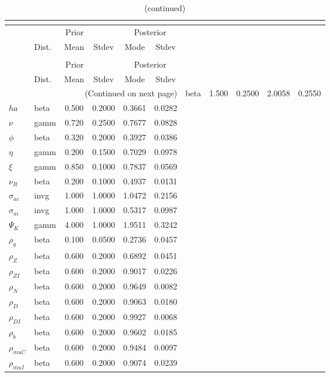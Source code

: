 
\begin{center}
\begin{longtable}{llcccc} 
\caption{Results from posterior maximization (parameters)}\\
 \label{Table:Posterior:1}\\
\toprule 
  & \multicolumn{3}{c}{Prior}  &  \multicolumn{2}{c}{Posterior} \\
  \cmidrule(r{.75em}){2-4} \cmidrule(r{.75em}){5-6}
  & Dist. & Mean  & Stdev & Mode & Stdev \\ 
\midrule \endfirsthead 
\caption{(continued)}\\
 \bottomrule 
  & \multicolumn{3}{c}{Prior}  &  \multicolumn{2}{c}{Posterior} \\
  \cmidrule(r{.75em}){2-4} \cmidrule(r{.75em}){5-6}
  & Dist. & Mean  & Stdev & Mode & Stdev \\ 
\midrule \endhead 
\bottomrule \multicolumn{6}{r}{(Continued on next page)}\endfoot 
\bottomrule\endlastfoot 
${\sigma}$ & beta &   1.500 & 0.2500 &   2.0058 &  0.2550 \\ 
${ha}$ & beta &   0.500 & 0.2000 &   0.3661 &  0.0282 \\ 
$\nu$ & gamm &   0.720 & 0.2500 &   0.7677 &  0.0828 \\ 
${\phi}$ & beta &   0.320 & 0.2000 &   0.3927 &  0.0386 \\ 
${\eta}$ & gamm &   0.200 & 0.1500 &   0.7029 &  0.0978 \\ 
$\xi$ & gamm &   0.850 & 0.1000 &   0.7837 &  0.0569 \\ 
${\nu_R}$ & beta &   0.200 & 0.1000 &   0.4937 &  0.0131 \\ 
${\sigma_{ac}}$ & invg &   1.000 & 1.0000 &   1.0472 &  0.2156 \\ 
${\sigma_{ai}}$ & invg &   1.000 & 1.0000 &   0.5317 &  0.0987 \\ 
${\Psi_{K}}$ & gamm &   4.000 & 1.0000 &   1.9511 &  0.3242 \\ 
${\rho_g}$ & beta &   0.100 & 0.0500 &   0.2736 &  0.0457 \\ 
${\rho_Z}$ & beta &   0.600 & 0.2000 &   0.6892 &  0.0451 \\ 
${\rho_{ZI}}$ & beta &   0.600 & 0.2000 &   0.9017 &  0.0226 \\ 
${\rho_N}$ & beta &   0.600 & 0.2000 &   0.9649 &  0.0082 \\ 
${\rho_D}$ & beta &   0.600 & 0.2000 &   0.9063 &  0.0180 \\ 
${\rho_{DI}}$ & beta &   0.600 & 0.2000 &   0.9927 &  0.0068 \\ 
${\rho_b}$ & beta &   0.600 & 0.2000 &   0.9602 &  0.0185 \\ 
${\rho_{muC}}$ & beta &   0.600 & 0.2000 &   0.9484 &  0.0097 \\ 
${\rho_{muI}}$ & beta &   0.600 & 0.2000 &   0.9074 &  0.0239 \\ 
\end{longtable}
 \end{center}
